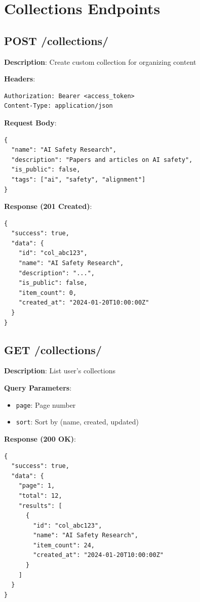 \documentclass[12pt,a4paper]{report}
\begin{document}
\chapter{Collections Endpoints}

\section{POST /collections/}

\textbf{Description}: Create custom collection for organizing content

\textbf{Headers}:
\begin{lstlisting}
Authorization: Bearer <access_token>
Content-Type: application/json
\end{lstlisting}

\textbf{Request Body}:
\begin{lstlisting}
{
  "name": "AI Safety Research",
  "description": "Papers and articles on AI safety",
  "is_public": false,
  "tags": ["ai", "safety", "alignment"]
}
\end{lstlisting}

\textbf{Response (201 Created)}:
\begin{lstlisting}
{
  "success": true,
  "data": {
    "id": "col_abc123",
    "name": "AI Safety Research",
    "description": "...",
    "is_public": false,
    "item_count": 0,
    "created_at": "2024-01-20T10:00:00Z"
  }
}
\end{lstlisting}

\section{GET /collections/}

\textbf{Description}: List user's collections

\textbf{Query Parameters}:
\begin{itemize}
    \item \texttt{page}: Page number
    \item \texttt{sort}: Sort by (name, created, updated)
\end{itemize}

\textbf{Response (200 OK)}:
\begin{lstlisting}
{
  "success": true,
  "data": {
    "page": 1,
    "total": 12,
    "results": [
      {
        "id": "col_abc123",
        "name": "AI Safety Research",
        "item_count": 24,
        "created_at": "2024-01-20T10:00:00Z"
      }
    ]
  }
}
\end{lstlisting}
\end{document}

